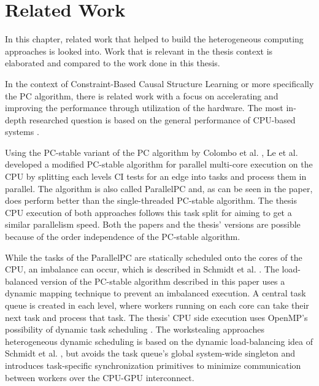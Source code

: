 \chapter{Related Work}
\label{chap:relwork}
In this chapter, related work that helped to build the heterogeneous computing approaches is looked into. Work that is relevant in the thesis context is elaborated and compared to the work done in this thesis.

In the context of Constraint-Based Causal Structure Learning or more specifically the PC algorithm, there is related work with a focus on accelerating and improving the performance through utilization of the hardware. The most in-depth researched question is based on the general performance of CPU-based systems \cite{leFastPCAlgorithm2019, leParallelPCPackageEfficient2018, schmidtLoadBalancedParallelConstraintBased2019, colomboOrderIndependentConstraintBasedCausal2014,kalischEstimatingHighDimensionalDirected2007,scutariBayesianNetworkConstraintBased2017, madsenParallelAlgorithmBayesian2017,madsenParallelisationPCAlgorithm2015,nguyenMrPCCausalStructure2020}. 

Using the PC-stable variant of the PC algorithm by Colombo et al. \cite{colomboOrderIndependentConstraintBasedCausal2014}, Le et al. \cite{leFastPCAlgorithm2019, leParallelPCPackageEfficient2018} developed a modified PC-stable algorithm for parallel multi-core execution on the CPU by splitting each levels CI tests for an edge into tasks and process them in parallel. The algorithm is also called ParallelPC and, as can be seen in the paper, does perform better than the single-threaded PC-stable algorithm. The thesis CPU execution of both approaches follows this task split for aiming to get a similar parallelism speed. Both the papers and the thesis' versions are possible because of the order independence of the PC-stable algorithm.

While the tasks of the ParallelPC are statically scheduled onto the cores of the CPU, an imbalance can occur, which is described in Schmidt et al. \cite{schmidtLoadBalancedParallelConstraintBased2019}. The load-balanced version of the PC-stable algorithm described in this paper uses a dynamic mapping technique to prevent an imbalanced execution. A central task queue is created in each level, where workers running on each core can take their next task and process that task. The thesis' CPU side execution uses OpenMP's possibility of dynamic task scheduling \cite{breshearsArtConcurrencyThread2009}. The workstealing approaches heterogeneous dynamic scheduling is based on the dynamic load-balancing idea of Schmidt et al. \cite{schmidtLoadBalancedParallelConstraintBased2019}, but avoids the task queue's global system-wide singleton and introduces task-specific synchronization primitives to minimize communication between workers over the CPU-GPU interconnect.

